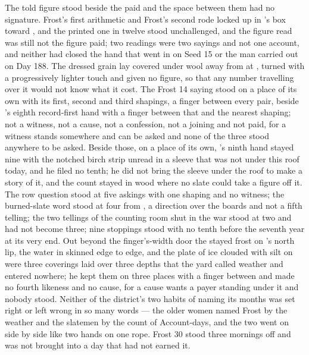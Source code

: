 The told figure stood beside the paid and the space between them had no signature. Frost's first arithmetic and Frost's second rode locked up  in 's box toward , and the printed one in twelve stood unchallenged, and the figure read was still not the figure paid; two readings were two sayings and not one account, and neither had closed the hand that went in on Seed 15 or the man carried out on Day 188. The dressed grain lay covered under wool away from  at , turned with a progressively lighter touch and given no figure, so that any number travelling over it would not know what it cost. The Frost 14 saying stood on a place of its own with its first, second and third shapings, a finger between every pair, beside 's eighth record-first hand with a finger between that and the nearest shaping; not a witness, not a cause, not a confession, not a joining and not paid, for a witness stands somewhere and can be asked and none of the three stood anywhere to be asked. Beside those, on a place of its own, 's ninth hand stayed nine with the notched birch strip unread in a sleeve that was not under this roof today, and he filed no tenth; he did not bring the sleeve under the roof to make a story of it, and the count stayed in wood where no slate could take a figure off it. The row question stood at five askings with one shaping and no witness; the burned-slate word stood at four from , a direction over the boards and not a fifth telling; the two tellings of the counting room shut in the war stood at two and had not become three; nine stoppings stood with no tenth before the seventh year at its very end. Out beyond the finger's-width door the stayed frost on 's north lip, the water in  skinned edge to edge, and the plate of ice clouded with silt on  were three coverings laid over three depths that the yard called weather and entered nowhere; he kept them on three places with a finger between and made no fourth likeness and no cause, for a cause wants a payer standing under it and nobody stood. Neither of the district's two habits of naming its months was set right or left wrong in so many words --- the older women named Frost by the weather and the slatemen by the count of Account-days, and the two went on side by side like two hands on one rope. Frost 30 stood three mornings off and was not brought into a day that had not earned it.

